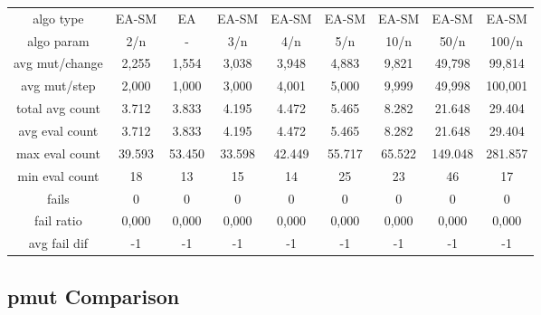 \begin{tabular}[h]{ccccccccc}
algo type&          EA-SM&      EA&   EA-SM&   EA-SM&   EA-SM&   EA-SM&   EA-SM&   EA-SM\\
algo param&           2/n&       -&     3/n&     4/n&     5/n&    10/n&    50/n&   100/n\\
avg mut/change&     2,255&   1,554&   3,038&   3,948&   4,883&   9,821&  49,798&  99,814\\
avg mut/step&       2,000&   1,000&   3,000&   4,001&   5,000&   9,999&  49,998& 100,001\\
\hline
total avg count&    3.712&   3.833&   4.195&   4.472&   5.465&   8.282&  21.648&  29.404\\
avg eval count&     3.712&   3.833&   4.195&   4.472&   5.465&   8.282&  21.648&  29.404\\
max eval count&    39.593&  53.450&  33.598&  42.449&  55.717&  65.522& 149.048& 281.857\\
min eval count&        18&      13&      15&      14&      25&      23&      46&      17\\
\hline
fails&                  0&       0&       0&       0&       0&       0&       0&       0\\
fail ratio&         0,000&   0,000&   0,000&   0,000&   0,000&   0,000&   0,000&   0,000\\
avg fail dif&          -1&      -1&      -1&      -1&      -1&      -1&      -1&      -1\\
\end{tabular}


\subsection{pmut Comparison}


